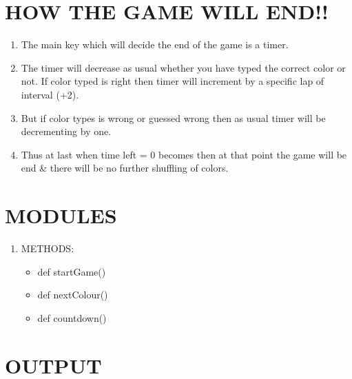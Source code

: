 \documentclass[12pt]{article}
\begin{document}
\section{HOW THE GAME WILL END!!}
\begin{enumerate}
	\item The main key which will decide the end of the game is a timer.
	\item The timer will decrease as usual whether you have typed the correct color or not. If color typed is right then timer will increment by a specific lap of interval (+2).
	
	\item But if color types is wrong or guessed wrong then as usual timer will be decrementing by one.
	
	\item Thus at last when time left = 0 becomes then at that point the game will be end \& there will be no further shuffling of colors.
\end{enumerate}	

\section{MODULES}

\begin{enumerate}
	\item METHODS:
	
	\begin{itemize}
		\item def startGame()
		\item def nextColour()
		\item def countdown()		
	\end{itemize}
\end{enumerate}

\newpage
\section{OUTPUT}
 
\end{document}
